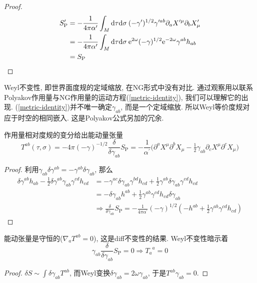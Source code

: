 \begin{tcolorbox}
    \begin{proof}
        \begin{align}
            S^\prime_{\mathrm{P}} &= -\frac{1}{4\pi\alpha^\prime}\int_M \mathrm{d}\tau\mathrm{d}\sigma\: (-\gamma^\prime)^{1/2}\gamma^{\prime ab}\partial_a X^{\prime \mu}\partial_b X^\prime _\mu \nonumber \\
            &= -\frac{1}{4\pi\alpha^\prime}\int_M \mathrm{d}\tau\mathrm{d}\sigma\: \mathrm{e}^{2\omega}(-\gamma)^{1/2}\mathrm{e}^{-2\omega}\gamma^{ab}h_{ab} \nonumber \\
            &= S_{\mathrm{P}} \nonumber
            \end{align}
    \end{proof}
\end{tcolorbox}
\noindent
Weyl不变性, 即世界面度规的定域缩放, 在NG形式中没有对比. 通过观察用以联系Polyakov作用量与NG作用量的运动方程(\ref{metric-identity}), 我们可以理解它的出现. (\ref{metric-identity})并不唯一确定$\gamma_{ab}$, 而是一个定域缩放. 所以Weyl等价度规对应于时空的相同嵌入. 这是Polyakov公式另加的冗余. 

作用量相对度规的变分给出能动量张量
\begin{equation}
T^{ab}(\tau,\sigma)=-4\pi(-\gamma)^{-1/2}\frac{\delta}{\delta\gamma_{ab}}S_{\mathrm{P}}=-\frac{1}{\alpha^\prime}\bigl(\partial^a X^\mu \partial^b X_\mu-\tfrac{1}{2}\gamma_{ab}\partial_c X^\mu \partial^c X_\mu\bigr)
\end{equation}
\begin{tcolorbox}
    \begin{proof}
        利用$\gamma_{ab}\delta \gamma^{ab}=-\gamma^{ab}\delta\gamma_{ab}$, 那么
    \begin{align*}
    \delta \gamma^{ab}h_{ab}-\tfrac{1}{2}\delta \gamma^{ab}\gamma_{ab}\gamma^{cd}h_{cd} \nonumber
    &=-\gamma^{ac}\delta\gamma_{ab}\gamma^{bd}h_{cd}+\tfrac{1}{2}\gamma^{ab}\delta\gamma_{ab}\gamma^{cd}h_{cd} \nonumber\\
    &=-\delta\gamma_{ab}h^{ab}+\tfrac{1}{2}\gamma^{ab}\gamma^{cd}h_{cd}\delta\gamma_{ab} \nonumber \\
    &\Longrightarrow 
    \frac{\delta}{\delta\gamma_{ab}}S_{\mathrm{P}}=-\frac{1}{4\pi\alpha^\prime}(-\gamma)^{1/2}(-h^{ab}+\tfrac{1}{2}\gamma^{ab}\gamma^{cd}h_{cd})
    \end{align*}
    \end{proof}
\end{tcolorbox}

能动张量是守恒的($\nabla_a T^{ab}=0$), 这是diff不变性的结果. 
Weyl不变性暗示着
\begin{equation}
\gamma_{ab}\frac{\delta}{\delta\gamma_{ab}}S_{\mathrm{P}}=0 \Rightarrow {T_a} ^a=0
\end{equation}
\begin{tcolorbox}
\begin{proof}
    $\delta S \sim \int \delta\gamma_{ab} T^{ab}$, 而Weyl变换$\delta\gamma_{ab}=2\omega \gamma_{ab}$, 于是$T^{ab}\gamma_{ab}=0$.
\end{proof}
\end{tcolorbox}

